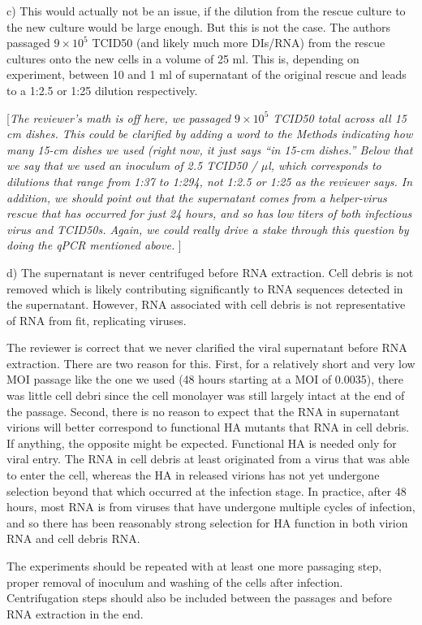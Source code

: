 \documentclass[11pt, oneside]{article}   	%
\newcommand{\comment}[1]{{\color{red}[\textsl{#1}]}}
\newcommand{\response}[1]{{\color{black}#1}}
\begin{document}
c) This would actually not be an issue, if the dilution from the rescue culture to the new culture would be large enough. But this is not the case. The authors passaged $9\times10^5$ TCID50 (and likely much more DIs/RNA) from the rescue cultures onto the new cells in a volume of 25 ml. This is, depending on experiment, between 10 and 1 ml of supernatant of the original rescue and leads to a 1:2.5 or 1:25 dilution respectively. 

\comment{The reviewer's math is off here, we passaged $9\times 10^5$ TCID50 \emph{total} across all 15 cm dishes. 
This could be clarified by adding a word to the Methods indicating how many 15-cm dishes we used (right now, it just says ``in 15-cm dishes.''
Below that we say that we used an inoculum of 2.5 TCID50 / $\mu$l, which corresponds to dilutions that range from 1:37 to 1:294, not 1:2.5 or 1:25 as the reviewer says.
In addition, we should point out that the supernatant comes from a helper-virus rescue that has occurred for just 24 hours, and so has low titers of both infectious virus and TCID50s.
Again, we could really drive a stake through this question by doing the qPCR mentioned above.
}

d) The supernatant is never centrifuged before RNA extraction. Cell debris is not removed which is likely contributing significantly to RNA sequences detected in the supernatant. However, RNA associated with cell debris is not representative of RNA from fit, replicating viruses. 

\response{The reviewer is correct that we never clarified the viral supernatant before RNA extraction.
There are two reason for this.
First, for a relatively short and very low MOI passage like the one we used (48 hours starting at a MOI of 0.0035), there was little cell debri since the cell monolayer was still largely intact at the end of the passage.
Second, there is no reason to expect that the RNA in supernatant virions will better correspond to functional HA mutants that RNA in cell debris.
If anything, the opposite might be expected.
Functional HA is needed only for viral entry.
The RNA in cell debris at least originated from a virus that was able to enter the cell, whereas the HA in released virions has not yet undergone selection beyond that which occurred at the infection stage.
In practice, after 48 hours, most RNA is from viruses that have undergone multiple cycles of infection, and so there has been reasonably strong selection for HA function in both virion RNA and cell debris RNA.
}

The experiments should be repeated with at least one more passaging step, proper removal of inoculum and washing of the cells after infection. Centrifugation steps should also be included between the passages and before RNA extraction in the end. 
\end{document}
